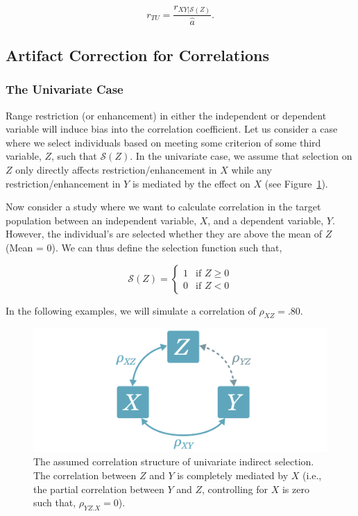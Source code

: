 \documentclass[
  letterpaper,
  DIV=11,
  numbers=noendperiod]{scrreprt}
\begin{document}
\[
r_{TU} = \frac{ r_{XY|\mathcal{S}(Z)} }{ \hat{a}}.
\]

\hypertarget{artifact-correction-for-correlations}{%
\subsection{Artifact Correction for
Correlations}\label{artifact-correction-for-correlations}}

\hypertarget{the-univariate-case-2}{%
\subsubsection*{The Univariate Case}\label{the-univariate-case-2}}

Range restriction (or enhancement) in either the independent or
dependent variable will induce bias into the correlation coefficient.
Let us consider a case where we select individuals based on meeting some
criterion of some third variable, \(Z\), such that \(\mathcal{S}(Z)\).
In the univariate case, we assume that selection on \(Z\) only directly
affects restriction/enhancement in \(X\) while any
restriction/enhancement in \(Y\) is mediated by the effect on \(X\) (see
Figure~\ref{fig-corr-model-uni}).

Now consider a study where we want to calculate correlation in the
target population between an independent variable, \(X\), and a
dependent variable, \(Y\). However, the individual's are selected
whether they are above the mean of \(Z\) (Mean = 0). We can thus define
the selection function such that,

\[
\mathcal{S}(Z) = \begin{cases} 1 & \text{if } Z \geq 0 \\ 0 & \text{if } Z < 0 \end{cases}
\]

In the following examples, we will simulate a correlation of
\(\rho_{XZ}=.80\).

\begin{figure}[H]

{\centering \includegraphics{figure/indirect_select_corr_model_uni.png}

}

\caption{\label{fig-corr-model-uni}The assumed correlation structure of
univariate indirect selection. The correlation between \(Z\) and \(Y\)
is completely mediated by \(X\) (i.e., the partial correlation between
\(Y\) and \(Z\), controlling for \(X\) is zero such that,
\(\rho_{YZ.X}=0\)).}

\end{figure}
\end{document}
